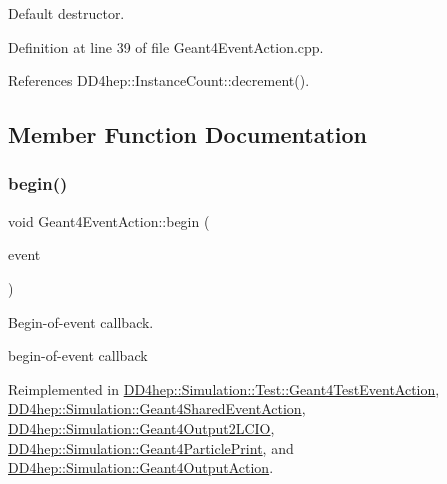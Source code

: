 Default destructor. 



Definition at line 39 of file Geant4\+Event\+Action.\+cpp.



References D\+D4hep\+::\+Instance\+Count\+::decrement().



\subsection{Member Function Documentation}
\hypertarget{class_d_d4hep_1_1_simulation_1_1_geant4_event_action_ad10785d157fa962f4ef2a5361bb0f5da}{}\label{class_d_d4hep_1_1_simulation_1_1_geant4_event_action_ad10785d157fa962f4ef2a5361bb0f5da} 
\subsubsection{\texorpdfstring{begin()}{begin()}}
{\footnotesize\ttfamily void Geant4\+Event\+Action\+::begin (\begin{DoxyParamCaption}\item[{const G4\+Event $\ast$}]{event }\end{DoxyParamCaption})\hspace{0.3cm}{\ttfamily [virtual]}}



Begin-\/of-\/event callback. 

begin-\/of-\/event callback 

Reimplemented in \hyperlink{class_d_d4hep_1_1_simulation_1_1_test_1_1_geant4_test_event_action_a9bce3a0885c7d2d5c6b03756ea3c4e23}{D\+D4hep\+::\+Simulation\+::\+Test\+::\+Geant4\+Test\+Event\+Action}, \hyperlink{class_d_d4hep_1_1_simulation_1_1_geant4_shared_event_action_a64b5998713b09c32de56774b1d69f64d}{D\+D4hep\+::\+Simulation\+::\+Geant4\+Shared\+Event\+Action}, \hyperlink{class_d_d4hep_1_1_simulation_1_1_geant4_output2_l_c_i_o_a36b7ecdf04169c4597bae18e021b60ea}{D\+D4hep\+::\+Simulation\+::\+Geant4\+Output2\+L\+C\+IO}, \hyperlink{class_d_d4hep_1_1_simulation_1_1_geant4_particle_print_ad1a3cbd1ef6837aa2bccb3b01c415d8f}{D\+D4hep\+::\+Simulation\+::\+Geant4\+Particle\+Print}, and \hyperlink{class_d_d4hep_1_1_simulation_1_1_geant4_output_action_afaad36616c890ac39e80421d340efd47}{D\+D4hep\+::\+Simulation\+::\+Geant4\+Output\+Action}.



